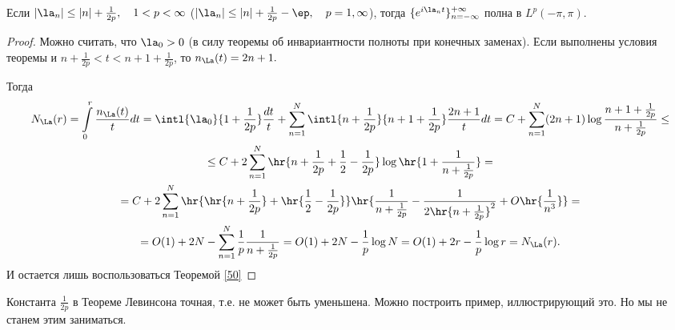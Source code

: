 \documentclass{article}
\begin{document}
\begin{imp}
Если $|\la_n|\le|n|+\frac1{2p},\quad1<p<\infty$
($|\la_n|\le|n|+\frac1{2p}-\ep,\quad p=1,\infty$),
тогда $\{e^{i\la_n t}\}_{n=-\infty}^{+\infty}$ полна в
$L^p(-\pi,\pi).$
\end{imp}
\begin{proof}
  Можно считать, что $\la_0>0$ (в силу
  теоремы об инвариантности полноты при конечных заменах). Если
  выполнены условия теоремы и $n+\frac1{2p}<t<n+1+\frac1{2p}$, то
  $n_{\La}(t)=2n+1.$

  Тогда
  \begin{multline*}
    N_{\La}(r)=\int\limits_0^r\frac{n_{\La}(t)}tdt=\intl{\la_0}{1+\frac1{2p}}\frac{dt}t+\sum\limits_{n=1}^N\intl{n+\frac1{2p}}{n+1+\frac1{2p}}\frac{2n+1}t
    dt=C+\sum\limits_{n=1}^N(2n+1)\log\frac{n+1+\frac1{2p}}{n+\frac1{2p}}\le\\
    \le
    C+2\sum\limits_{n=1}^N\hr{n+\frac1{2p}+\frac12-\frac1{2p}}\log\hr{1+\frac1{n+\frac1{2p}}}=\\
    =C+2\sum\limits_{n=1}^N\hr{\hr{n+\frac1{2p}}+\hr{\frac12-\frac1{2p}}}\hr{\frac1{n+\frac1{2p}}-\frac1{2\hr{n+\frac1{2p}}^2}+O\hr{\frac1{n^3}}}=\\
    =O(1)+2N-\sum\limits_{n=1}^N\frac1p\frac1{n+\frac1{2p}}=O(1)+2N-\frac1p\log
    N=O(1)+2r-\frac1p\log r=N_{\La}(r).
  \end{multline*}
  И остается лишь воспользоваться Теоремой \ref{50}
\end{proof}

\begin{note}
  Константа $\frac1{2p}$ в Теореме
  Левинсона точная, т.е. не может быть уменьшена. Можно построить
  пример, иллюстрирующий это. Но мы не станем этим заниматься.
\end{note}
\end{document}
